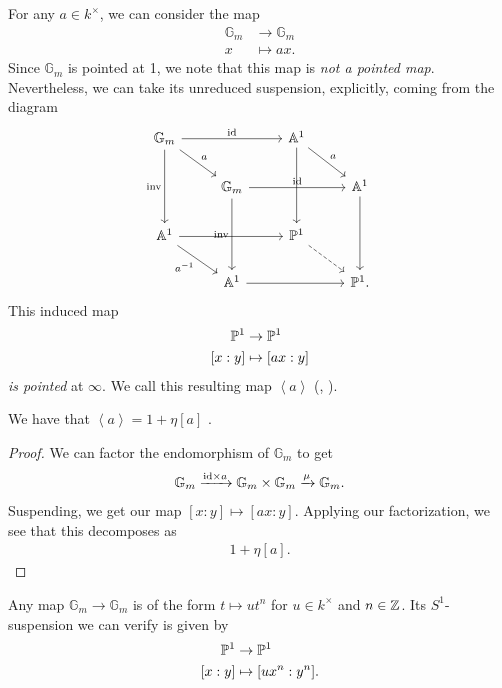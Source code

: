 \documentclass[11pt,openany]{book}
\begin{document}
For any $a\in k^\times$, we can consider the map
\begin{align*}
    \mathbb{G}_m &\to \mathbb{G}_m \\
    x &\mapsto ax.
\end{align*}
Since $\mathbb{G}_m$ is pointed at 1, we note that this map is \textit{not a pointed map}. Nevertheless, we can take its unreduced suspension, explicitly, coming from the diagram
\[\begin{tikzcd}
    \mathbb{G}_m\ar[dr,"a"]\ar[rr,"\id"]\ar[dd,"\inv" left] &  & \A^1\ar[dr,"a" above right]\ar[dd] & \\
     & \mathbb{G}_m\ar[dd,"\inv" left]\ar[rr,"\id"] &  & \A^1\ar[dd]\\
    \A^1\ar[dr,"a^{-1}" below left]\ar[rr] &  & \P^1\ar[dr,dashed] & \\
     & \A^1\ar[rr] &  & \P^1.
\end{tikzcd} \]
This induced map
\begin{align*}
    \P^1 &\to \P^1 \\
    [x:y] &\mapsto [ax:y]
\end{align*}
\textit{is pointed} at $\infty$. We call this resulting map $\left\langle a \right\rangle$ (\cite[6.3.4]{Morel-trieste}, \cite[p.~74]{Morel}).




\begin{lemma}\label{lem:bracket-a-stable-htpy}
We have that $\left\langle a \right\rangle = 1 + \eta[a]$ \cite[3.43(1)]{Morel}.
\end{lemma}
\begin{proof} We can factor the endomorphism of $\mathbb{G}_m$ to get
\begin{align*}
    \mathbb{G}_m \xto{\id \times a} \mathbb{G}_m \times \mathbb{G}_m \xto{\mu} \mathbb{G}_m.
\end{align*}
Suspending, we get our map $[x:y] \mapsto [ax:y]$. Applying our factorization, we see that this decomposes as
\begin{align*}
    1 + \eta[a].
\end{align*}
\end{proof}

\begin{remark} Any map $\mathbb{G}_m \to \mathbb{G}_m$ is of the form $t \mapsto ut^n$ for $u\in k^\times$ and $n\in \Z$. Its $S^1$-suspension we can verify is given by
\begin{align*}
    \P^1 &\to \P^1 \\
    [x:y] &\mapsto [ux^n : y^n].
\end{align*}
\end{remark}
\end{document}
